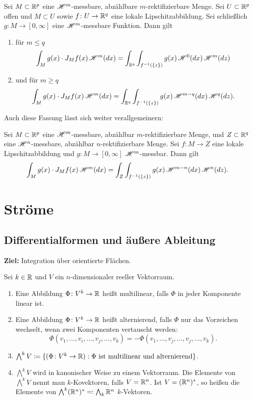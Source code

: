 \documentclass[a4paper,twoside,DIV15,BCOR12mm]{scrbook}
\newcommand{\HM}{\H}
\begin{document}
\begin{satz}
Sei $M\subset\mathbb{R}^p$ eine $\HM^m$-messbare, abzählbare $m$-rektifizierbare Menge. Sei $U\subset \mathbb{R}^p$ offen und $M\subset U$ sowie $f\colon U\to\mathbb{R}^q$ eine lokale Lipschitzabbildung. Sei schließlich $g\colon M \to [0,\infty]$ eine $\HM^m$-messbare Funktion. Dann gilt
\begin{enumerate}[\quad(a)]
\item für $m\le q$
\[
\int_M g(x) \cdot J_Mf(x)\, \HM^m(dx) =
\int_{\MdR^q} \int_{f^{-1}(\{z\})} g(x)\, \HM^0(dx)\, \HM^m(dz)
\]
\item und für $m\ge q$
\[
\int_M g(x) \cdot J_Mf(x)\, \HM^m(dx) =
\int_{\MdR^q} \int_{f^{-1}(\{z\})} g(x)\, \HM^{m-q}(dx)\, \HM^q(dz).
\]
\end{enumerate}
\end{satz}

\pagebreak[1]
Auch diese Fassung lässt sich weiter verallgemeinern:
\begin{satz}
Sei $M\subset\mathbb{R}^p$ eine $\HM^m$-messbare, abzählbar $m$-rektifizierbare Menge, und $Z\subset\mathbb{R}^q$ eine $\HM^n$-messbare, abzählbar $n$-rektifizierbare Menge. Sei $f\colon M\to Z$ eine lokale Lipschitzabbildung und $g:M\to [0,\infty]$ $\HM^m$-messbar. Dann gilt
\[
\int_M g(x) \cdot J_Mf(x) \, \HM^m(dx) = \int_Z \int_{f^{-1}(\{z\})} g(x)\, \HM^{m-n}(dx)\, \HM^n(dz).
\]
\end{satz}

\chapter{Ströme}

\section{Differentialformen und äußere Ableitung}

\textbf{Ziel:} Integration über orientierte Flächen.

\begin{definition}
Sei $k\in \mathbb{R}$ und $V$ ein $n$-dimensionaler reeller Vektorraum.
\begin{enumerate}
\item Eine Abbildung $\Phi\colon V^k\to \mathbb{R}$ heißt multilinear, falls $\Phi$ in jeder Komponente linear ist.
\item Eine Abbildung $\Phi\colon V^k\to\mathbb{R}$ heißt alternierend, falls $\Phi$ nur das Vorzeichen wechselt, wenn zwei Komponenten vertauscht werden:
\[
\Phi(v_1,\ldots,v_i,\ldots,v_j,\ldots,v_k) = -\Phi(v_1,\ldots,v_j,\ldots,v_j,\ldots,v_k).
\]
\item $\bigwedge^k V \da\{ (\Phi\colon V^k\to \MdR) : \Phi \text{ ist multilinear und alternierend}\}$.
\item $\bigwedge^k V$ wird in kanonischer Weise zu einem Vektorraum. Die Elemente von $\bigwedge^k V$ nennt man $k$-Kovektoren, falls $V=\mathbb{R}^n$. Ist $V=(\mathbb{R}^n)^*$, so heißen die Elemente von $\bigwedge^k (\MdR^n)^* \ad \bigwedge_k\MdR^n$ $k$-Vektoren.
\end{enumerate}
\end{definition}
\end{document}
